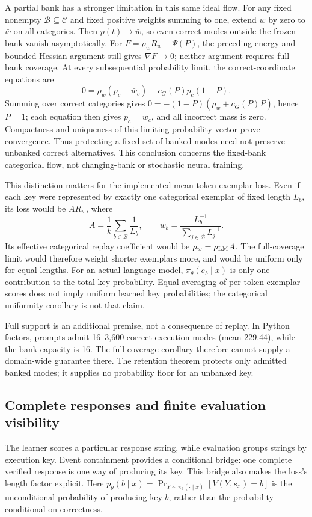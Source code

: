 \documentclass{article}
\newcommand{\1}{\mathbf 1}
\theoremstyle{remark}
\theoremstyle{definition}
\theoremstyle{plain}
\begin{document}
A partial bank has a stronger limitation in this same ideal flow. For any
fixed nonempty $\mathcal B\subseteq\mathcal C$ and fixed positive weights
summing to one, extend $w$ by zero to $\bar w$ on all categories. Then
$p(t)\to\bar w$, so even correct modes outside the frozen bank vanish
asymptotically. For $F=\rho_wR_w-\Psi(P)$, the preceding energy and
bounded-Hessian argument still gives $\nabla F\to0$; neither argument
requires full bank coverage.
At every subsequential probability limit, the correct-coordinate equations are
\[
 0=\rho_w(p_c-\bar w_c)-c_G(P)p_c(1-P).
\]
Summing over correct categories gives
$0=-(1-P)(\rho_w+c_G(P)P)$, hence $P=1$; each equation then gives
$p_c=\bar w_c$, and all incorrect mass is zero. Compactness and uniqueness
of this limiting probability vector prove convergence. Thus protecting a
fixed set of banked modes need not preserve unbanked correct alternatives.
This conclusion concerns the fixed-bank categorical flow, not changing-bank
or stochastic neural training.

This distinction matters for the implemented mean-token exemplar loss.
Even if each key were represented by exactly one categorical exemplar of
fixed length $L_b$, its loss would be $A R_w$, where
\[
 A=\frac1k\sum_{b\in\mathcal B}\frac1{L_b},\qquad
 w_b=\frac{L_b^{-1}}{\sum_{j\in\mathcal B}L_j^{-1}}.
\]
Its effective categorical replay coefficient would be $\rho_w=\rho_{\rm LM}A$.
The full-coverage limit would therefore weight shorter exemplars more, and
would be uniform only for equal lengths. For an actual language model,
$\pi_\theta(e_b\mid x)$ is only one contribution to the total key probability.
Equal averaging of per-token exemplar scores does not imply uniform learned
key probabilities; the categorical uniformity corollary is not that claim.

Full support is an additional premise, not a consequence of replay. In
Python factors, prompts admit 16--3,600 correct execution modes (mean 229.44),
while the bank capacity is 16. The full-coverage corollary therefore cannot
supply a domain-wide guarantee there. The retention theorem protects only
admitted banked modes; it supplies no probability floor for an unbanked key.

\subsection{Complete responses and finite evaluation visibility}
\label{app:theory-exemplar-bridge}

The learner scores a particular response string, while evaluation groups
strings by execution key. Event containment provides a conditional bridge:
one complete verified response is one way of producing its key. This bridge
also makes the loss's length factor explicit. Here
$p_\theta(b\mid x)=\Pr_{Y\sim\pi_\theta(\cdot\mid x)}[V(Y,s_x)=b]$
is the unconditional probability of producing key $b$, rather than the
probability conditional on correctness.
\end{document}
